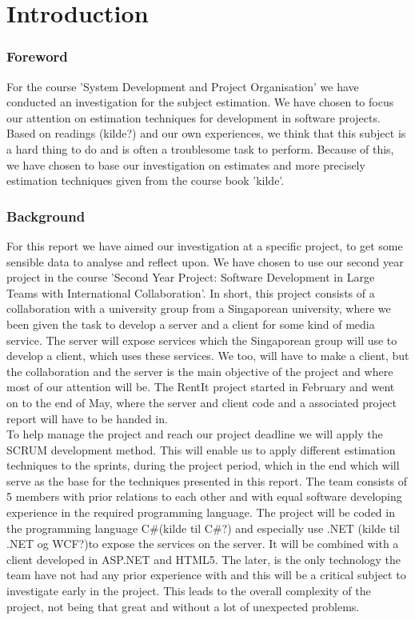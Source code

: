 \part{Introduction}
\section{Foreword}
For the course 'System Development and Project Organisation' we have conducted an investigation for the subject estimation. We have chosen to focus our attention on estimation techniques for development in software projects. Based on readings (kilde?) and our own experiences, we think that this subject is a hard thing to do and is often a troublesome task to perform. Because of this, we have chosen to base our investigation on estimates and more precisely estimation techniques given from the course book 'kilde'. 

\section{Background}
For this report we have aimed our investigation at a specific project, to get some sensible data to analyse and reflect upon. We have chosen to use our second year project in the course 'Second Year Project: Software Development in Large Teams with International Collaboration'. In short, this project consists of a collaboration with a university group from a Singaporean university, where we been given the task to develop a server and a client for some kind of media service. The server will expose services which the Singaporean group will use to develop a client, which uses these services. We too, will have to make a client, but the collaboration and the server is the main objective of the project  and where most of our attention will be. The RentIt project started in February and went on to the end of May, where the server and client code and a associated project report will have to be handed in. \\ 

To help manage the project and reach our project deadline we will apply the SCRUM development method. This will enable us to apply different estimation techniques to the sprints, during the project period, which in the end which will serve as the base for the techniques presented in this report. The team consists of 5 members with prior relations to each other and with equal software developing experience in the required programming language. The project will be coded in the programming language C\#(kilde til C\#?) and especially use .NET (kilde til .NET og WCF?)to expose the services on the server. It will be combined with a client developed in ASP.NET and HTML5. The later, is the only technology the team have not had any prior experience with and this will be a critical subject to investigate early in the project. This leads to the overall complexity of the project, not being that great and without a lot of unexpected problems. 

